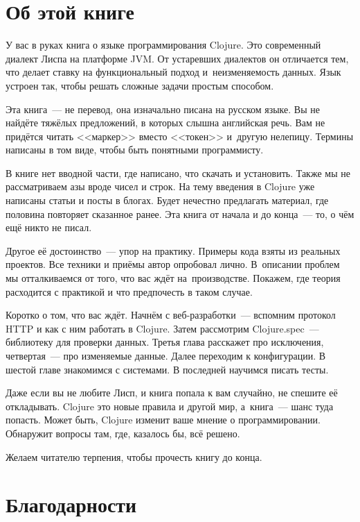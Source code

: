 
\section*{Об этой книге}

У вас в руках книга о языке программирования Clojure. Это современный диалект
Лиспа на платформе JVM. От устаревших диалектов он отличается тем, что делает
ставку на функциональный подход и~неизменяемость данных. Язык устроен так, чтобы
решать сложные задачи простым способом.

Эта книга~--- не перевод, она изначально писана на русском языке. Вы не найдёте
тяжёлых предложений, в которых слышна английская речь. Вам не придётся читать
<<маркер>> вместо <<токен>> и~другую нелепицу. Термины написаны в том виде,
чтобы быть понятными программисту.

В книге нет вводной части, где написано, что скачать и установить. Также мы не
рассматриваем азы вроде чисел и строк. На тему введения в Clojure уже написаны
статьи и посты в блогах. Будет нечестно предлагать материал, где половина
повторяет сказанное ранее. Эта книга от начала и до конца~--- то, о чём ещё
никто не писал.

Другое её достоинство~--- упор на практику. Примеры кода взяты из реальных
проектов. Все техники и приёмы автор опробовал лично. В~описании проблем мы
отталкиваемся от того, что вас ждёт на~производстве. Покажем, где теория
расходится с практикой и что предпочесть в таком случае.

Коротко о том, что вас ждёт. Начнём с веб-разработки~--- вспомним протокол HTTP
и как с ним работать в Clojure. Затем рассмотрим Clojure.spec~--- библиотеку для
проверки данных. Третья глава расскажет про исключения, четвертая~--- про
изменяемые данные. Далее переходим к конфигурации. В шестой главе знакомимся с
системами. В последней научимся писать тесты.

Даже если вы не любите Лисп, и книга попала к вам случайно, не спешите её
откладывать. Clojure это новые правила и другой мир, а~книга~--- шанс туда
попасть. Может быть, Clojure изменит ваше мнение о программировании. Обнаружит
вопросы там, где, казалось бы, всё решено.

Желаем читателю терпения, чтобы прочесть книгу до конца.

\newpage

\section*{Благодарности}

